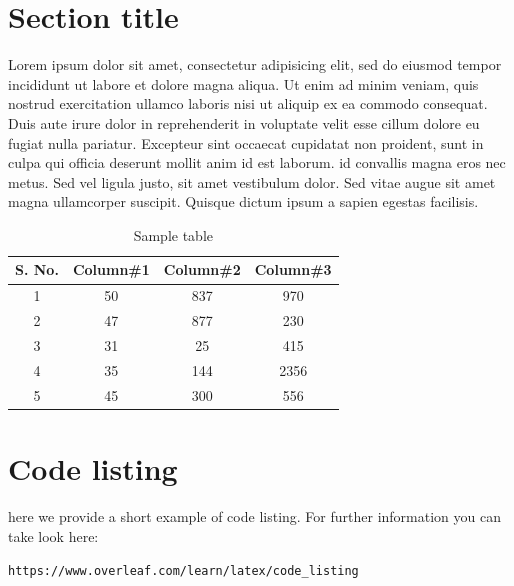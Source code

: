 \documentclass[a4paper,11pt]{report}
\begin{document}
    \section{Section title}
    Lorem ipsum dolor sit amet, consectetur adipisicing elit, sed do eiusmod tempor incididunt ut labore et dolore magna aliqua. Ut enim ad minim veniam, quis nostrud exercitation ullamco laboris nisi ut aliquip ex ea commodo consequat. \\ Duis aute irure dolor in reprehenderit in voluptate velit esse cillum dolore eu fugiat nulla pariatur. Excepteur sint occaecat cupidatat non proident, sunt in culpa qui officia deserunt mollit anim id est laborum.
    id convallis magna eros nec metus. Sed vel ligula justo, sit amet vestibulum dolor. Sed vitae augue sit amet magna ullamcorper suscipit. Quisque dictum ipsum a sapien egestas facilisis.

    \begin{table}[ht]
        \caption{Sample table} %
        \centering %
        \begin{tabular}{c c c c}
            \hline\hline %
            S. No. & Column\#1 & Column\#2 & Column\#3 \\ [0.5ex]
            \hline %
            1      & 50        & 837       & 970       \\
            2      & 47        & 877       & 230       \\
            3      & 31        & 25        & 415       \\
            4      & 35        & 144       & 2356      \\
            5      & 45        & 300       & 556 \\ [1ex] %
            \hline %
        \end{tabular}
        \label{table:nonlin} %
    \end{table}


    \section{Code listing}

    here we provide a short example of code listing. For further information you can take look here:

    \texttt{https://www.overleaf.com/learn/latex/code\_listing}
\end{document}
